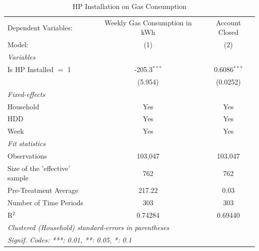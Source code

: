 
\begin{table}[htbp]
   \caption{\label{tab:hp-did-gas-conso} HP Installation on Gas Consumption}
   \centering
   \begin{tabular}{lcc}
      \tabularnewline \midrule \midrule
      Dependent Variables:           & Weekly Gas Consumption in kWh & Account Closed\\  
      Model:                         & (1)                           & (2)\\  
      \midrule
      \emph{Variables}\\
      Is HP Installed $=$ 1          & -205.3$^{***}$                & 0.6086$^{***}$\\   
                                     & (5.954)                       & (0.0252)\\   
      \midrule
      \emph{Fixed-effects}\\
      Household                      & Yes                           & Yes\\  
      HDD                            & Yes                           & Yes\\  
      Week                           & Yes                           & Yes\\  
      \midrule
      \emph{Fit statistics}\\
      Observations                   & 103,047                       & 103,047\\  
      Size of the 'effective' sample & 762                           & 762\\  
      Pre-Treatment Average          & 217.22                        & 0.03\\  
      Number of Time Periods         & 303                           & 303\\  
      R$^2$                          & 0.74284                       & 0.69440\\  
      \midrule \midrule
      \multicolumn{3}{l}{\emph{Clustered (Household) standard-errors in parentheses}}\\
      \multicolumn{3}{l}{\emph{Signif. Codes: ***: 0.01, **: 0.05, *: 0.1}}\\
   \end{tabular}
\end{table}


